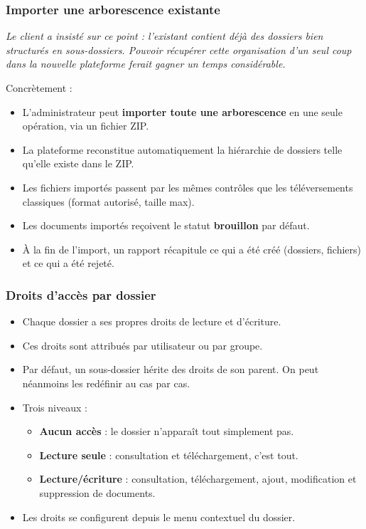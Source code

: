 \documentclass[a4paper,12pt,french]{article}
\begin{document}
\subsubsection{Importer une arborescence existante}

\textit{Le client a insisté sur ce point : l'existant contient déjà des dossiers bien structurés en sous-dossiers. Pouvoir récupérer cette organisation d'un seul coup dans la nouvelle plateforme ferait gagner un temps considérable.}

Concrètement :

\begin{itemize}[leftmargin=1.5em]
  \item L'administrateur peut \textbf{importer toute une arborescence} en une seule opération, via un fichier ZIP.
  \item La plateforme reconstitue automatiquement la hiérarchie de dossiers telle qu'elle existe dans le ZIP.
  \item Les fichiers importés passent par les mêmes contrôles que les téléversements classiques (format autorisé, taille max).
  \item Les documents importés reçoivent le statut \textbf{brouillon} par défaut.
  \item À la fin de l'import, un rapport récapitule ce qui a été créé (dossiers, fichiers) et ce qui a été rejeté.
\end{itemize}

\subsubsection{Droits d'accès par dossier}

\begin{itemize}[leftmargin=1.5em]
  \item Chaque dossier a ses propres droits de lecture et d'écriture.
  \item Ces droits sont attribués par utilisateur ou par groupe.
  \item Par défaut, un sous-dossier hérite des droits de son parent. On peut néanmoins les redéfinir au cas par cas.
  \item Trois niveaux :
    \begin{itemize}
      \item \textbf{Aucun accès} : le dossier n'apparaît tout simplement pas.
      \item \textbf{Lecture seule} : consultation et téléchargement, c'est tout.
      \item \textbf{Lecture/écriture} : consultation, téléchargement, ajout, modification et suppression de documents.
    \end{itemize}
  \item Les droits se configurent depuis le menu contextuel du dossier.
\end{itemize}
\end{document}
